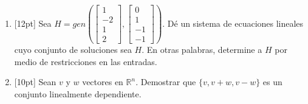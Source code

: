 \documentclass[11pt]{article}
\begin{document}
\begin{enumerate}
\vspace{6cm}

\item{}[12pt] Sea $H = gen\left(\begin{bmatrix}1\\-2\\1\\2\end{bmatrix},\begin{bmatrix}0\\1\\-1\\-1\end{bmatrix}\right)$. Dé un sistema de ecuaciones lineales cuyo conjunto de soluciones sea $H$. En otras palabras, determine a $H$ por medio de restricciones en las entradas.

\vspace{8cm}

\item{}[10pt] Sean $v$ y $w$ vectores en $\mathbb{R}^n$. Demostrar que $\{v, v+w, v-w\}$ es un conjunto linealmente dependiente.

\vspace{4cm}
\end{enumerate}

\examfooter
\end{document}

